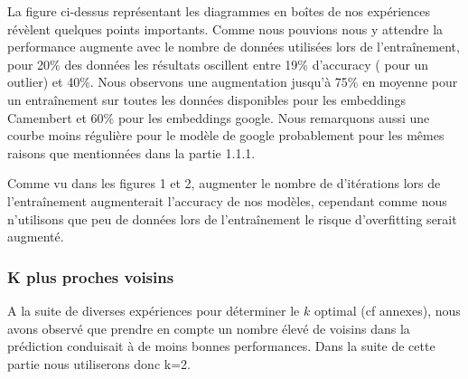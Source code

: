 \documentclass[12pt]{article}
\begin{document}
La figure ci-dessus représentant les diagrammes en boîtes de nos expériences révèlent quelques points importants. 
Comme nous pouvions nous y attendre la performance augmente avec le nombre de données utilisées lors de l'entraînement,
pour 20\% des données  les résultats oscillent entre 19\% d'accuracy ( pour un outlier) et 40\%. Nous observons une augmentation 
jusqu'à 75\% en moyenne pour un entraînement sur toutes les données disponibles pour les embeddings Camembert et 60\% pour les 
embeddings google. Nous remarquons aussi une courbe moins régulière pour le modèle de google probablement pour les mêmes raisons que 
mentionnées dans la partie 1.1.1.

Comme vu dans les figures 1 et 2, augmenter le nombre de d'itérations lors de l'entraînement augmenterait l'accuracy 
de nos modèles, cependant comme nous n'utilisons que peu de données lors de l'entraînement le risque d'overfitting serait augmenté.
\subsubsection{K plus proches voisins}

A la suite de diverses expériences pour déterminer le $k$ optimal (cf annexes), nous avons observé que prendre en 
compte un nombre élevé de voisins dans la prédiction conduisait à de moins bonnes performances. Dans la suite de cette 
partie nous utiliserons donc k=2.
\end{document}

